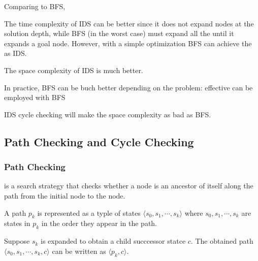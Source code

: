 \begin{remark}
    Comparing to BFS,

    \begin{listu}
        \item The {\color{darkGreen}time complexity} of IDS can be better since it does not expand nodes at the solution depth, while BFS (in the worst case) must expand all the  until it expands a goal node. However, with a simple optimization BFS can achieve the  as IDS.

        \item The {\color{darkGreen}space complexity} of IDS is much better.

        \begin{listu}
            \item In practice, BFS can be buch better depending on the problem: effective  can be employed with BFS
            \item IDS cycle checking will make the space complexity as bad as BFS.
        \end{listu}
    \end{listu}
\end{remark}

\subsection{Path Checking and Cycle Checking}

\subsubsection{Path Checking}

\begin{definition}\label{def:path-checking}
     is a search strategy that checks whether a node is an ancestor of itself along the path from the initial node to the node.
\end{definition}

\begin{remark}[Notation]
    \begin{listu}
        \item A path $p_k$ is represented as a typle of states $\langle s_0, s_1, \cdots, s_k \rangle$ where $s_0, s_1, \cdots, s_k$ are states in $p_k$ in the order they appear in the path.
        \item Suppose $s_k$ is expanded to obtain a child succcessor statce $c$. The obtained path $\langle s_0, s_1, \cdots, s_k, c \rangle$ can be written as $\langle p_k, c \rangle$.
    \end{listu}
\end{remark}

